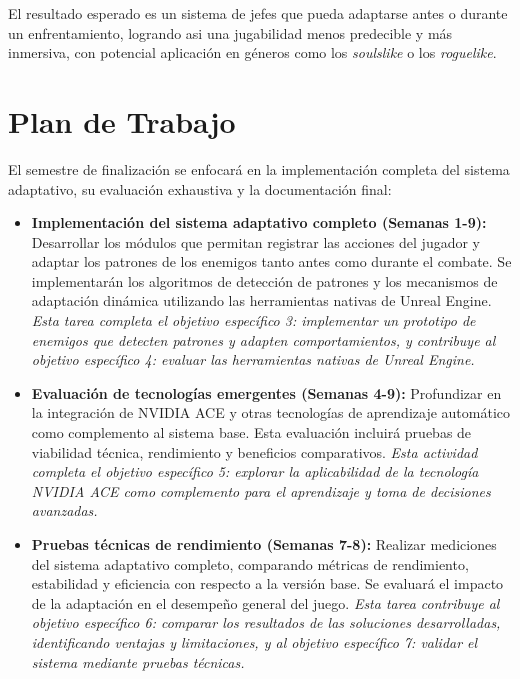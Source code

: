 \documentclass[informe]{upropuesta}
\begin{document}
El resultado esperado es un sistema de jefes que pueda adaptarse antes o durante un enfrentamiento, logrando asi una jugabilidad menos predecible y más inmersiva, con potencial aplicación en géneros como los \textit{soulslike} o los \textit{roguelike}.


\section{Plan de Trabajo}\label{sec:pdt}


El semestre de finalización se enfocará en la implementación completa del sistema adaptativo, su evaluación exhaustiva y la documentación final:

\begin{itemize}
    \item \textbf{Implementación del sistema adaptativo completo (Semanas 1-9):} Desarrollar los módulos que permitan registrar las acciones del jugador y adaptar los patrones de los enemigos tanto antes como durante el combate. Se implementarán los algoritmos de detección de patrones y los mecanismos de adaptación dinámica utilizando las herramientas nativas de Unreal Engine. \textit{Esta tarea completa el objetivo específico 3: implementar un prototipo de enemigos que detecten patrones y adapten comportamientos, y contribuye al objetivo específico 4: evaluar las herramientas nativas de Unreal Engine.}
    
    \item \textbf{Evaluación de tecnologías emergentes (Semanas 4-9):} Profundizar en la integración de NVIDIA ACE y otras tecnologías de aprendizaje automático como complemento al sistema base. Esta evaluación incluirá pruebas de viabilidad técnica, rendimiento y beneficios comparativos. \textit{Esta actividad completa el objetivo específico 5: explorar la aplicabilidad de la tecnología NVIDIA ACE como complemento para el aprendizaje y toma de decisiones avanzadas.}
    
    \item \textbf{Pruebas técnicas de rendimiento (Semanas 7-8):} Realizar mediciones del sistema adaptativo completo, comparando métricas de rendimiento, estabilidad y eficiencia con respecto a la versión base. Se evaluará el impacto de la adaptación en el desempeño general del juego. \textit{Esta tarea contribuye al objetivo específico 6: comparar los resultados de las soluciones desarrolladas, identificando ventajas y limitaciones, y al objetivo específico 7: validar el sistema mediante pruebas técnicas.}
    

\end{itemize}
\end{document}
